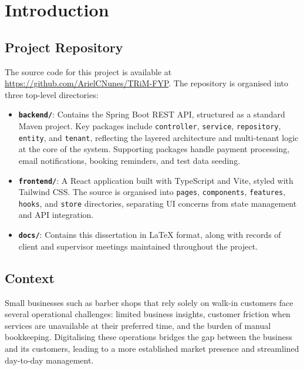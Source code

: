 \chapter{Introduction}

\section{Project Repository}
The source code for this project is available at \url{https://github.com/ArielCNunes/TRiM-FYP}. The repository is organised into three top-level directories:

\begin{itemize}                                                                                                              
    \item \textbf{\texttt{backend/}}: Contains the Spring Boot REST API, structured as a standard Maven project. Key packages include \texttt{controller}, \texttt{service}, \texttt{repository}, \texttt{entity}, and \texttt{tenant}, reflecting the layered architecture and multi-tenant logic at the core of the system. Supporting packages handle payment processing, email notifications, booking reminders, and test data seeding.                                                                                            
    \item \textbf{\texttt{frontend/}}: A React application built with TypeScript and Vite, styled with Tailwind CSS. The source is organised into \texttt{pages}, \texttt{components}, \texttt{features}, \texttt{hooks}, and \texttt{store} directories, separating UI concerns from state management and API integration.
    \item \textbf{\texttt{docs/}}: Contains this dissertation in \LaTeX{} format, along with records of client and supervisor meetings maintained throughout the project.
\end{itemize}  

\section{Context}
Small businesses such as barber shops that rely solely on walk-in customers face several operational challenges: limited business insights, customer friction when services are unavailable at their preferred time, and the burden of manual bookkeeping. Digitalising these operations bridges the gap between the business and its customers, leading to a more established market presence and streamlined day-to-day management.

